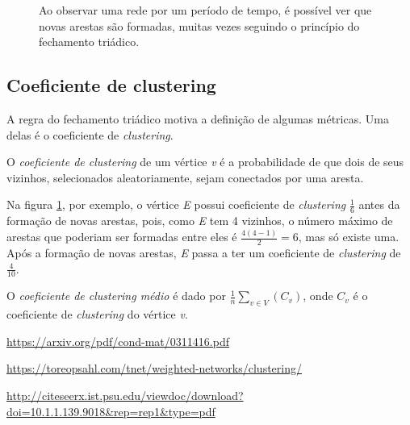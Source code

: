 \begin{figure}
    \center
    \qquad

    \caption{Ao observar uma rede por um período de tempo, é possível ver que novas arestas são formadas, muitas vezes seguindo o princípio do fechamento triádico.}
    \label{fig:grafo-fechamento-triadico}
\end{figure}

\subsection{Coeficiente de clustering}
\label{conceitos__fechamento-triadico--coeficiente-clustering}

A regra do fechamento triádico motiva a definição de algumas métricas. Uma delas é o coeficiente de \emph{clustering}.

O \emph{coeficiente de clustering} de um vértice \emph{v} é a probabilidade de que dois de seus vizinhos, selecionados aleatoriamente, sejam conectados por uma aresta.

Na figura \ref{fig:grafo-fechamento-triadico}, por exemplo, o vértice \emph{E} possui coeficiente de \emph{clustering} $\frac{1}{6}$ antes da formação de novas arestas, pois, como \emph{E} tem 4 vizinhos, o número máximo de arestas que poderiam ser formadas entre eles é $\frac{4(4 - 1)}{2} = 6$, mas só existe uma. Após a formação de novas arestas, \emph{E} passa a ter um coeficiente de \emph{clustering} de $\frac{4}{10}$.

O \emph{coeficiente de clustering médio} é dado por $\frac{1}{n}\sum_{v\in V}(C_{v})$, onde $C_{v}$ é o coeficiente de \emph{clustering} do vértice \emph{v}.



\url{https://arxiv.org/pdf/cond-mat/0311416.pdf}

\url{https://toreopsahl.com/tnet/weighted-networks/clustering/}

\url{http://citeseerx.ist.psu.edu/viewdoc/download?doi=10.1.1.139.9018&rep=rep1&type=pdf}

